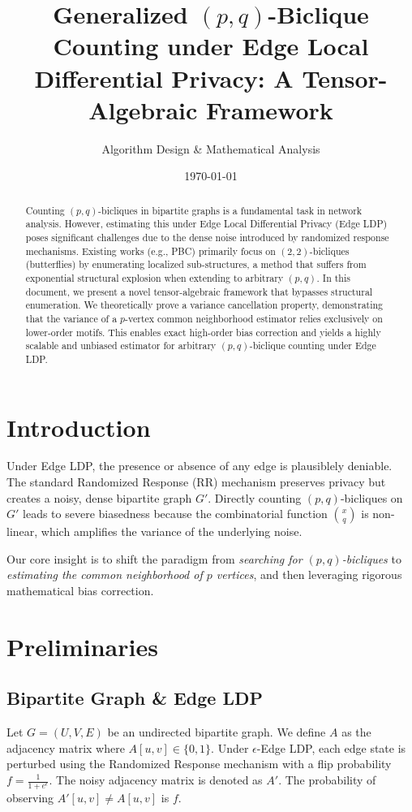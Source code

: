 \documentclass[11pt,a4paper]{article}
\title{\textbf{Generalized $(p,q)$-Biclique Counting under Edge Local Differential Privacy: A Tensor-Algebraic Framework}}
\author{Algorithm Design \& Mathematical Analysis}
\date{\today}
\begin{document}
\maketitle

\begin{abstract}
Counting $(p,q)$-bicliques in bipartite graphs is a fundamental task in network analysis. However, estimating this under Edge Local Differential Privacy (Edge LDP) poses significant challenges due to the dense noise introduced by randomized response mechanisms. Existing works (e.g., PBC) primarily focus on $(2,2)$-bicliques (butterflies) by enumerating localized sub-structures, a method that suffers from exponential structural explosion when extending to arbitrary $(p,q)$. In this document, we present a novel tensor-algebraic framework that bypasses structural enumeration. We theoretically prove a variance cancellation property, demonstrating that the variance of a $p$-vertex common neighborhood estimator relies exclusively on lower-order motifs. This enables exact high-order bias correction and yields a highly scalable and unbiased estimator for arbitrary $(p,q)$-biclique counting under Edge LDP.
\end{abstract}

\section{Introduction}
Under Edge LDP, the presence or absence of any edge is plausiblely deniable. The standard Randomized Response (RR) mechanism preserves privacy but creates a noisy, dense bipartite graph $G'$. Directly counting $(p,q)$-bicliques on $G'$ leads to severe biasedness because the combinatorial function $\binom{x}{q}$ is non-linear, which amplifies the variance of the underlying noise. 

Our core insight is to shift the paradigm from \textit{searching for $(p,q)$-bicliques} to \textit{estimating the common neighborhood of $p$ vertices}, and then leveraging rigorous mathematical bias correction. 

\section{Preliminaries}
\subsection{Bipartite Graph \& Edge LDP}
Let $G = (U, V, E)$ be an undirected bipartite graph. We define $A$ as the adjacency matrix where $A[u,v] \in \{0,1\}$. 
Under $\epsilon$-Edge LDP, each edge state is perturbed using the Randomized Response mechanism with a flip probability $f = \frac{1}{1+e^\epsilon}$. 
The noisy adjacency matrix is denoted as $A'$. The probability of observing $A'[u,v] \neq A[u,v]$ is $f$.
\end{document}
